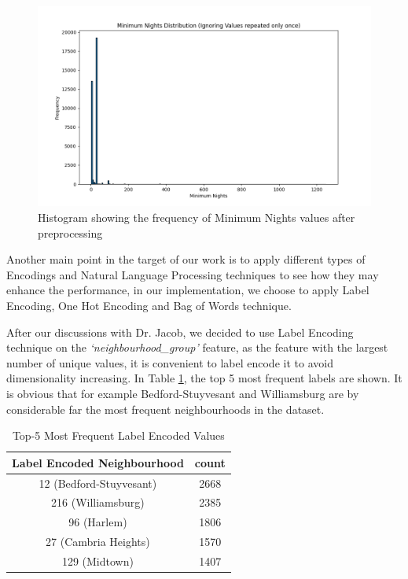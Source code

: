 \documentclass[a4paper,12pt]{article}
\begin{document}
\begin{figure}[!t]
\centering
\includegraphics[width=5.5in]{fig.png}
\caption{Histogram showing the frequency of Minimum Nights values after preprocessing}
\label{histo}
\end{figure}


Another main point in the target of our work is to apply different types of Encodings and Natural Language Processing techniques to see how they may enhance the performance, in our implementation, we choose to apply Label Encoding, One Hot Encoding and Bag of Words technique.

After our discussions with Dr. Jacob, we decided to use Label Encoding technique on the \textit{`neighbourhood\_group'} feature, as the feature with the largest number of unique values, it is convenient to label encode it to avoid dimensionality increasing. In Table \ref{tab:neighbourhood_label_encoded}, the top 5 most frequent labels are shown. It is obvious that for example Bedford-Stuyvesant and Williamsburg are by considerable far the most frequent neighbourhoods in the dataset.

\begin{table}[h!]
\centering
\begin{tabular}{|c|c|}
\hline
\textbf{Label Encoded Neighbourhood} & \textbf{count} \\ \hline
12 (Bedford-Stuyvesant) & 2668 \\ \hline
216 (Williamsburg) & 2385 \\ \hline
96 (Harlem) & 1806 \\ \hline
27 (Cambria Heights) & 1570 \\ \hline
129 (Midtown) & 1407 \\ \hline
\end{tabular}
\caption{Top-5 Most Frequent Label Encoded Values}
\label{tab:neighbourhood_label_encoded}
\end{table}
\end{document}
